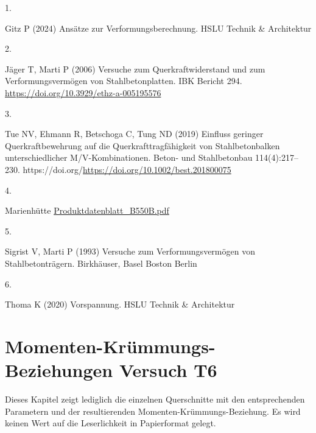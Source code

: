 \documentclass[
  11pt,
  letterpaper,
]{scrreprt}
\newlength{\cslhangindent}
\newlength{\csllabelwidth}
\newenvironment{CSLReferences}[2] %
 {\begin{list}{}{%
  \setlength{\itemindent}{0pt}
  \setlength{\leftmargin}{0pt}
  \setlength{\parsep}{0pt}
  \ifodd #1
   \setlength{\leftmargin}{\cslhangindent}
   \setlength{\itemindent}{-1\cslhangindent}
  \fi
  \setlength{\itemsep}{#2\baselineskip}}}
 {\end{list}}
\newcommand{\CSLLeftMargin}[1]{\parbox[t]{\csllabelwidth}{\strut#1\strut}}
\newcommand{\CSLRightInline}[1]{\parbox[t]{\linewidth - \csllabelwidth}{\strut#1\strut}}
\begin{document}

\label{refs}
\begin{CSLReferences}{0}{1}
\CSLLeftMargin{1. }%
\CSLRightInline{Gitz P (2024) Ansätze zur {Verformungsberechnung}. HSLU
Technik \& Architektur}

\CSLLeftMargin{2. }%
\CSLRightInline{Jäger T, Marti P (2006) Versuche zum
{Querkraftwiderstand} und zum {Verformungsvermögen} von
{Stahlbetonplatten}. IBK Bericht 294.
\url{https://doi.org/10.3929/ethz-a-005195576}}

\CSLLeftMargin{3. }%
\CSLRightInline{Tue NV, Ehmann R, Betschoga C, Tung ND (2019) Einfluss
geringer {Querkraftbewehrung} auf die {Querkrafttragfähigkeit} von
{Stahlbetonbalken} unterschiedlicher {M}/{V}-{Kombinationen}. Beton- und
Stahlbetonbau 114(4):217--230.
https://doi.org/\url{https://doi.org/10.1002/best.201800075}}

\CSLLeftMargin{4. }%
\CSLRightInline{Marienhütte
\href{https://www.marienhuette.at/wp-content/uploads/Produktdatenblatt-B550B.pdf}{Produktdatenblatt\_B550B.pdf}}

\CSLLeftMargin{5. }%
\CSLRightInline{Sigrist V, Marti P (1993) Versuche zum
{Verformungsvermögen} von {Stahlbetonträgern}. Birkhäuser, Basel Boston
Berlin}

\CSLLeftMargin{6. }%
\CSLRightInline{Thoma K (2020) Vorspannung. HSLU Technik \& Architektur}

\end{CSLReferences}

\cleardoublepage
{}
{}
\appendix

\chapter{Momenten-Krümmungs-Beziehungen Versuch
T6}\label{momenten-kruxfcmmungs-beziehungen-versuch-t6}


Dieses Kapitel zeigt lediglich die einzelnen Querschnitte mit den
entsprechenden Parametern und der resultierenden
Momenten-Krümmungs-Beziehung. Es wird keinen Wert auf die Leserlichkeit
in Papierformat gelegt.
\end{document}

